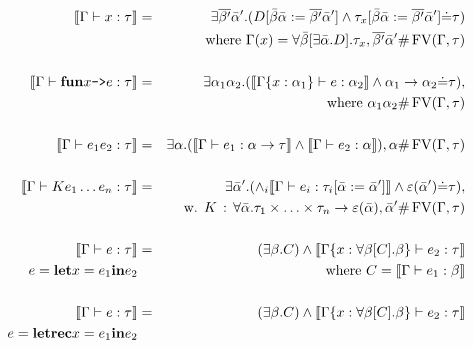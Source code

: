 \documentclass{beamer}
\newcommand{\assign}{:=}
\newcommand{\colons}{\,:\,}
\newcommand{\tmmathbf}[1]{\ensuremath{\boldsymbol{#1}}}
\newcommand{\tmop}[1]{\ensuremath{\operatorname{#1}}}
\newcommand{\tmverbatim}[1]{\text{{\ttfamily{#1}}}}
\begin{document}
\begin{eqnarray*}
  \llbracket \Gamma \vdash x : \tau \rrbracket & = & \exists \overline{\beta'}
  \bar{\alpha}' . (D [\bar{\beta} \bar{\alpha} \assign \overline{\beta'}
  \bar{\alpha}'] \wedge \tau_x [\bar{\beta} \bar{\alpha} \assign
  \overline{\beta'} \bar{\alpha}'] \dot{=} \tau)\\
  &  & \text{where } \Gamma (x) = \forall \bar{\beta} [\exists \bar{\alpha}
  .D] . \tau_x, \overline{\beta'} \bar{\alpha}' \# \tmop{FV} (\Gamma, \tau)\\
  &  & \\
  \left\llbracket \Gamma \vdash \tmmathbf{\tmop{fun}} x \text{\tmverbatim{->}}
  e : \tau \right\rrbracket & = & \exists \alpha_1 \alpha_2 . (\llbracket
  \Gamma \{ x : \alpha_1 \} \vdash e : \alpha_2 \rrbracket \wedge \alpha_1
  \rightarrow \alpha_2 \dot{=} \tau),\\
  &  & \text{where } \alpha_1 \alpha_2 \# \tmop{FV} (\Gamma, \tau)\\
  &  & \\
  \llbracket \Gamma \vdash e_1 e_2 : \tau \rrbracket & = & \exists \alpha .
  (\llbracket \Gamma \vdash e_1 : \alpha \rightarrow \tau \rrbracket \wedge
  \llbracket \Gamma \vdash e_2 : \alpha \rrbracket), \alpha \# \tmop{FV}
  (\Gamma, \tau)\\
  &  & \\
  \llbracket \Gamma \vdash K e_1 \ldots e_n : \tau \rrbracket & = & \exists
  \bar{\alpha}' . (\wedge_i \llbracket \Gamma \vdash e_i : \tau_i
  [\bar{\alpha} \assign \bar{\alpha}'] \rrbracket \wedge \varepsilon
  (\bar{\alpha}') \dot{=} \tau),\\
  &  & \text{w. } K \colons \forall \bar{\alpha} . \tau_1 \times \ldots
  \times \tau_n \rightarrow \varepsilon (\bar{\alpha}), \bar{\alpha}' \#
  \tmop{FV} (\Gamma, \tau)\\
  &  & \\
  \llbracket \Gamma \vdash e : \tau \rrbracket & = & (\exists \beta .C) \wedge
  \llbracket \Gamma \{x : \forall \beta [C] . \beta\} \vdash e_2 : \tau
  \rrbracket\\
  e = \tmmathbf{\tmop{let}} x = e_1 \tmmathbf{\tmop{in}} e_2 &  & \text{where
  } C = \llbracket \Gamma \vdash e_1 : \beta \rrbracket\\
  &  & \\
  \llbracket \Gamma \vdash e : \tau \rrbracket & = & (\exists \beta .C) \wedge
  \llbracket \Gamma \{x : \forall \beta [C] . \beta\} \vdash e_2 : \tau
  \rrbracket\\
  e = \tmmathbf{\tmop{letrec}} x = e_1 \tmmathbf{\tmop{in}} e_2 &  &

\end{eqnarray*}
\end{document}
